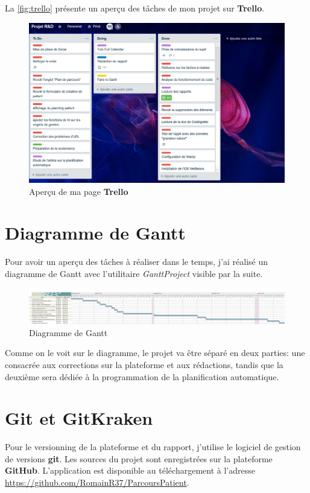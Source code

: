\documentclass[noposter]{polytech/polytech}
\begin{document}
La \autoref{fig:trello} présente un aperçu des tâches de mon projet sur \textbf{Trello}. 

\begin{figure}
	\includegraphics[scale=0.35]{images/trello}
	\caption{Aperçu de ma page \textbf{Trello}}
	\label{fig:trello}
\end{figure}

\section{Diagramme de Gantt}

Pour avoir un aperçu des tâches à réaliser dans le temps, j'ai réalisé un diagramme de Gantt avec l'utilitaire \textit{GanttProject} visible par la suite. 

\begin{figure}
	\includegraphics[scale=0.14]{images/gestion_projet}
	\caption{Diagramme de Gantt}
	\label{fig:gantt}
\end{figure}

Comme on le voit sur le diagramme, le projet va être séparé en deux parties: une consacrée aux corrections sur la plateforme et aux rédactions, tandis que la deuxième sera dédiée à la programmation de la planification automatique.

\section{Git et GitKraken}

Pour le versionning de la plateforme et du rapport, j'utilise le logiciel de gestion de versions \textbf{git}. Les sources du projet sont enregistrées sur la plateforme \textbf{GitHub}. L'application est disponible au téléchargement à l'adresse \url{https://github.com/RomainR37/ParcoursPatient}.
\end{document}
